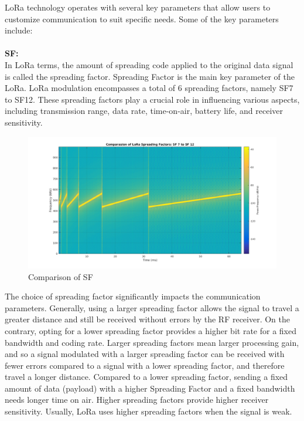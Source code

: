 \hspace{12pt} LoRa technology operates with several key parameters that allow users to customize communication to suit specific needs. Some of the key parameters include:\\
\\
\textbf{\ac{SF}:}\\

In LoRa terms, the amount of spreading code applied to the original data signal is called the spreading factor. Spreading Factor is the main key parameter of the LoRa. LoRa modulation encompasses a total of 6 spreading factors, namely SF7 to SF12. These spreading factors play a crucial role in influencing various aspects, including transmission range, data rate, time-on-air, battery life, and receiver sensitivity. \\

\begin{figure}[htp!]
    \centering
    \includegraphics[scale=0.35]{images/SF_Comparasion_7_12.png}
    \caption{Comparison of \ac{SF}}
\end{figure}

The choice of spreading factor significantly impacts the communication parameters. Generally, using a larger spreading factor allows the signal to travel a greater distance and still be received without errors by the RF receiver. On the contrary, opting for a lower spreading factor provides a higher bit rate for a fixed bandwidth and coding rate. Larger spreading factors mean larger processing gain, and so a signal modulated with a larger spreading factor can be received with fewer errors compared to a signal with a lower spreading factor, and therefore travel a longer distance. Compared to a lower spreading factor, sending a fixed amount of data (payload) with a higher Spreading Factor and a fixed bandwidth needs longer time on air. Higher spreading factors provide higher receiver sensitivity. Usually, LoRa uses higher spreading factors when the signal is weak.\\

